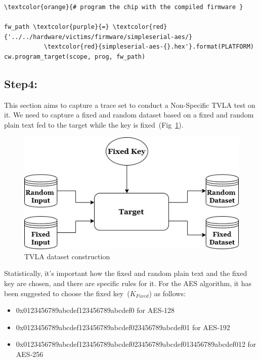 \documentclass[11pt]{article}
\newcommand{\inGreen}[1]{\textcolor{ao}{#1}}
\begin{document}
\begin{small} 
\begin{tcolorbox}
\begin{Verbatim}[commandchars=\\\{\}]
\textcolor{orange}{# program the chip with the compiled firmware }

fw_path \textcolor{purple}{=} \textcolor{red}{'../../hardware/victims/firmware/simpleserial-aes/}
           \textcolor{red}{simpleserial-aes-{}.hex'}.format(PLATFORM)
cw.program_target(scope, prog, fw_path)
\end{Verbatim}
\end{tcolorbox}
\end{small} 


\subsection{Step4:}
This section aims to capture a trace set to conduct a Non-Specific TVLA test on it. We need to capture a fixed and random dataset based on a fixed and random plain text fed to the target while the key is fixed~(Fig~\ref{fig:TVLA-Setup}). 

\begin{figure}[]
    \centering
    \includegraphics[scale=0.75]{TVLA-FI-Images/TVLA_setup.jpg}
    \caption{TVLA dataset construction}
    \label{fig:TVLA-Setup}
\end{figure}

\noindent Statistically, it's important how the fixed and random plain text and the fixed key are chosen, and there are specific rules for it. For the AES algorithm, it has been suggested to choose the fixed key~({$K_{Fixed}$}) as follows:

\begin{itemize}
    \item 0x0123456789abcdef123456789abcdef0 \inGreen{for AES‐128}
    \item 0x0123456789abcdef123456789abcdef023456789abcdef01 \inGreen{for AES‐192}
    \item 0x0123456789abcdef123456789abcdef023456789abcdef013456789abcdef012 \inGreen{for AES‐256} 

\end{itemize}
\end{document}
